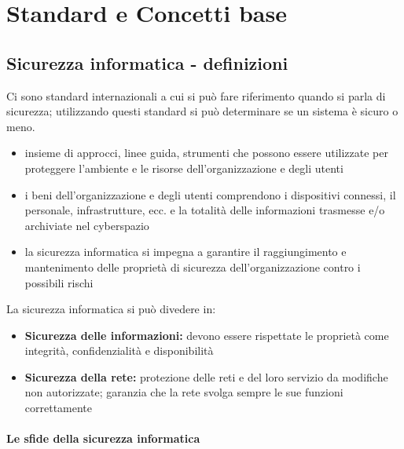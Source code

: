 \chapter{Standard e Concetti base}

\section{Sicurezza informatica - definizioni}

Ci sono standard internazionali a cui si può fare riferimento quando si parla di sicurezza; utilizzando questi standard si può determinare se un sistema è sicuro o meno.

\begin{itemize}
    \item insieme di approcci, linee guida, strumenti che possono essere utilizzate per proteggere l'ambiente e le risorse dell'organizzazione e degli utenti
    \item i beni dell'organizzazione e degli utenti comprendono i dispositivi connessi, il personale, infrastrutture, ecc. e la totalità delle informazioni trasmesse e/o archiviate nel cyberspazio
    \item la sicurezza informatica si impegna a garantire il raggiungimento e mantenimento delle proprietà di sicurezza dell'organizzazione contro i possibili rischi
\end{itemize}
La sicurezza informatica si può divedere in:
\begin{itemize}
    \item \textbf{Sicurezza delle informazioni:} devono essere rispettate le proprietà come integrità, confidenzialità e disponibilità
    \item \textbf{Sicurezza della rete:} protezione delle reti e del loro servizio da modifiche non autorizzate; garanzia che la rete svolga sempre le sue funzioni correttamente
\end{itemize}

\subsubsection{Le sfide della sicurezza informatica}

